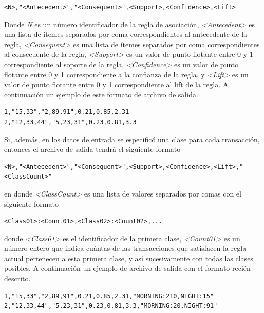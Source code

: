 \begin{lstlisting}[basicstyle=\ttfamily]
<N>,"<Antecedent>","<Consequent>",<Support>,<Confidence>,<Lift>
\end{lstlisting}

Donde \textit{N} es un número identificador de la regla de asociación, \textit{<Antecedent>} es una lista de ítemes separados por coma correspondientes al antecedente de la regla, \textit{<Consequent>} es una lista de ítemes separados por coma correspondientes al consecuente de la regla, \textit{<Support>} es un valor de punto flotante entre 0 y 1 correspondiente al soporte de la regla, \textit{<Confidence>} es un valor de punto flotante entre 0 y 1 correspondiente a la confianza de la regla, y \textit{<Lift>} es un valor de punto flotante entre 0 y 1 correspondiente al lift de la regla. A continuación un ejemplo de este formato de archivo de salida.

\begin{lstlisting}[basicstyle=\ttfamily]
1,"15,33","2,89,91",0.21,0.85,2.31
2,"12,33,44","5,23,31",0.23,0.81,3.3
\end{lstlisting}

Si, además, en los datos de entrada se especificó una clase para cada transacción, entonces el archivo de salida tendrá el siguiente formato

\begin{lstlisting}[basicstyle=\ttfamily]
<N>,"<Antecedent>","<Consequent>",<Support>,<Confidence>,<Lift>,"<ClassCount>"
\end{lstlisting}

en donde \textit{<ClassCount>} es una lista de valores separados por comas con el siguiente formato

\begin{lstlisting}[basicstyle=\ttfamily]
<Class01>:<Count01>,<Class02>:<Count02>,...
\end{lstlisting}

donde \textit{<Class01>} es el identificador de la primera clase, \textit{<Count01>} es un número entero que indica cuántas de las transacciones que satisfacen la regla actual pertenecen a esta primera clase, y así sucesivamente con todas las clases posibles. A continuación un ejemplo de archivo de salida con el formato recién descrito.

\begin{lstlisting}[basicstyle=\ttfamily]
1,"15,33","2,89,91",0.21,0.85,2.31,"MORNING:210,NIGHT:15"
2,"12,33,44","5,23,31",0.23,0.81,3.3,"MORNING:20,NIGHT:91"
\end{lstlisting}


